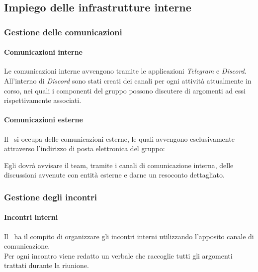   \subsection{Impiego delle infrastrutture interne}

    \subsubsection{Gestione delle comunicazioni}
      \paragraph{Comunicazioni interne}
        Le comunicazioni interne avvengono tramite le applicazioni \textit{Telegram} e \textit{Discord}. All'interno di \textit{Discord} sono stati creati dei canali per ogni attività attualmente in corso, nei quali i componenti del gruppo possono discutere di argomenti ad essi rispettivamente associati.
      
      \paragraph{Comunicazioni esterne}
        Il \roleProjectManager\ si occupa delle comunicazioni esterne, le quali avvengono esclusivamente attraverso l'indirizzo di posta elettronica del gruppo:\\
        \begin{center}
          \groupEmail
        \end{center}
        Egli dovrà avvisare il team, tramite i canali di comunicazione interna, delle discussioni avvenute con entità esterne e darne un resoconto dettagliato.

    \subsubsection{Gestione degli incontri}
      \paragraph{Incontri interni}
        Il \roleProjectManager\ ha il compito di organizzare gli incontri interni utilizzando l'apposito canale di comunicazione.\\
        Per ogni incontro viene redatto un verbale che raccoglie tutti gli argomenti trattati durante la riunione.


